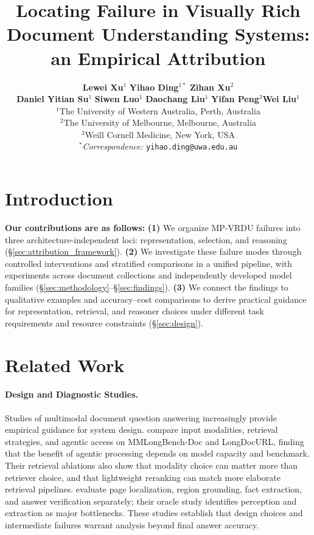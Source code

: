 \documentclass[11pt]{article}
\title{Locating Failure in Visually Rich Document Understanding Systems: an Empirical Attribution}
\author{
  \textbf{Lewei Xu}$^{1}$ \quad \textbf{Yihao Ding}$^{1*}$ \quad \textbf{Zihan Xu}$^2$ \\ \quad \textbf{Daniel Yitian Su$^{1}$} \quad
  \textbf{Siwen Luo}$^1$ \quad \textbf{Daochang Liu}$^1$ \quad \textbf{Yifan Peng}$^{3}$\quad \textbf{Wei Liu}$^1$ \\[4pt]
  $^1$The University of Western Australia, Perth, Australia \\[2pt]
  $^2$The University of Melbourne, Melbourne, Australia \\[2pt]
  $^{3}$Weill Cornell Medicine, New York, USA \\[2pt]
  $^*$\textit{Correspondence:}
  \texttt{yihao.ding@uwa.edu.au}
}
\begin{document}
\maketitle

\begin{abstract}

\end{abstract}

\section{Introduction}






\clearpage

\textbf{Our contributions are as follows:} \textbf{(1)} We organize MP-VRDU failures into three architecture-independent loci: representation, selection, and reasoning (\S\ref{sec:attribution_framework}). \textbf{(2)} We investigate these failure modes through controlled interventions and stratified comparisons in a unified pipeline, with experiments across document collections and independently developed model families (\S\ref{sec:methodology}--\S\ref{sec:findings}). \textbf{(3)} We connect the findings to qualitative examples and accuracy--cost comparisons to derive practical guidance for representation, retrieval, and reasoner choices under different task requirements and resource constraints (\S\ref{sec:design}).

\section{Related Work}
\label{sec:related_work}

\paragraph{Design and Diagnostic Studies.} Studies of multimodal document question answering increasingly provide empirical guidance for system design. \citeauthor{ak2026empirical} compare input modalities, retrieval strategies, and agentic access on MMLongBench-Doc and LongDocURL, finding that the benefit of agentic processing depends on model capacity and benchmark. Their retrieval ablations also show that modality choice can matter more than retriever choice, and that lightweight reranking can match more elaborate retrieval pipelines. \citeauthor{feng2026docscope} evaluate page localization, region grounding, fact extraction, and answer verification separately; their oracle study identifies perception and extraction as major bottlenecks. These studies establish that design choices and intermediate failures warrant analysis beyond final answer accuracy.
\end{document}
